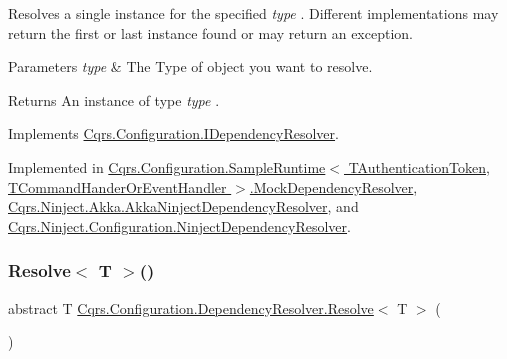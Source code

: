 Resolves a single instance for the specified {\itshape type} . Different implementations may return the first or last instance found or may return an exception. 


\begin{DoxyParams}{Parameters}
{\em type} & The Type of object you want to resolve.\\
\hline
\end{DoxyParams}
\begin{DoxyReturn}{Returns}
An instance of type {\itshape type} .
\end{DoxyReturn}


Implements \hyperlink{interfaceCqrs_1_1Configuration_1_1IDependencyResolver_aa455096b7b94fc1d64904bc67830ec06_aa455096b7b94fc1d64904bc67830ec06}{Cqrs.\+Configuration.\+I\+Dependency\+Resolver}.



Implemented in \hyperlink{classCqrs_1_1Configuration_1_1SampleRuntime_1_1MockDependencyResolver_ac4e52e995e2f8ff243d2af624d229461_ac4e52e995e2f8ff243d2af624d229461}{Cqrs.\+Configuration.\+Sample\+Runtime$<$ T\+Authentication\+Token, T\+Command\+Hander\+Or\+Event\+Handler $>$.\+Mock\+Dependency\+Resolver}, \hyperlink{classCqrs_1_1Ninject_1_1Akka_1_1AkkaNinjectDependencyResolver_adace29de71f10e34e952bd41e48106a6_adace29de71f10e34e952bd41e48106a6}{Cqrs.\+Ninject.\+Akka.\+Akka\+Ninject\+Dependency\+Resolver}, and \hyperlink{classCqrs_1_1Ninject_1_1Configuration_1_1NinjectDependencyResolver_ab9da7f1556cc1ef205d03d3ff62017c0_ab9da7f1556cc1ef205d03d3ff62017c0}{Cqrs.\+Ninject.\+Configuration.\+Ninject\+Dependency\+Resolver}.

\mbox{\label{classCqrs_1_1Configuration_1_1DependencyResolver_a1eb177fc6c914b45d138642fb6d9454d_a1eb177fc6c914b45d138642fb6d9454d}} 
\subsubsection{\texorpdfstring{Resolve$<$ T $>$()}{Resolve< T >()}}
{\footnotesize\ttfamily abstract T \hyperlink{classCqrs_1_1Configuration_1_1DependencyResolver_aaeeb3ad2e0ef44bd98469d843210205c_aaeeb3ad2e0ef44bd98469d843210205c}{Cqrs.\+Configuration.\+Dependency\+Resolver.\+Resolve}$<$ T $>$ (\begin{DoxyParamCaption}{ }\end{DoxyParamCaption})\hspace{0.3cm}{\ttfamily [pure virtual]}}




